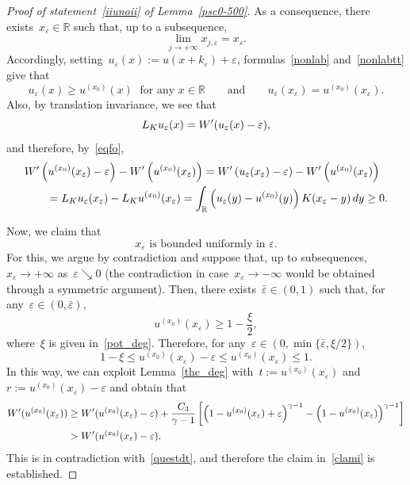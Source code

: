 \documentclass[10pt,a4paper]{amsart}
\numberwithin{equation}{section}
\newcommand{\R}{\mathbb{R}}
\renewcommand{\epsilon}{\varepsilon}
\begin{document}
\begin{proof}[Proof of statement~\eqref{iiunoii} of Lemma~\eqref{psc0-500}]
As a consequence, there exists~$x_{\epsilon} \in \R$ such that, up to a subsequence, $$\lim_{j \to +\infty} x_{j,\epsilon}=x_{\epsilon}.$$ Accordingly, setting~$u_{\epsilon}(x):= u(x+k_{\epsilon})+\epsilon$,
formulas~\eqref{nonlab} and~\eqref{nonlabtt} give that
\begin{equation}\label{eqfo}
u_{\epsilon}(x) \geq u^{(x_0)}(x) \;\mbox{ for any } x \in \R \qquad
{\mbox{and}}\qquad
u_{\epsilon}(x_{\epsilon})= u^{(x_0)}(x_{\epsilon}) .
\end{equation}
Also, by translation invariance, we see that
\begin{equation*}
{L}_K u_{\epsilon}(x) = W\rq{}(u_{\epsilon}(x)-\epsilon),
\end{equation*}
and therefore, by~\eqref{eqfo},
\begin{equation}\label{questdt}
\begin{split}&
W\rq{}\left( u^{(x_0)}(x_{\epsilon})-\epsilon \right) - W\rq{}\left( u^{(x_0)}(x_{\epsilon}) \right) = W\rq{}\left( u_{\epsilon}(x_{\epsilon})-\epsilon \right) -  W\rq{}\left( u^{(x_0)}(x_{\epsilon}) \right)\\ 
&\qquad=  {L}_K u_{\epsilon}(x_{\epsilon}) - {L}_K u^{(x_0)}(x_{\epsilon})
= \int_{\R} \left(u_{\epsilon}(y)-u^{(x_0)}(y)\right) K(x_{\epsilon}-y) \, dy \geq 0.
\end{split}
\end{equation}

Now, we claim that
\begin{equation}\label{clami}
{\mbox{$x_{\epsilon}$ is bounded uniformly in~$\epsilon$.}}
\end{equation}
For this, we argue by contradiction and suppose that, up to subsequences, $x_{\epsilon}\to +\infty$ as~$\epsilon \searrow 0$ (the contradiction in case~$x_{\epsilon}\to -\infty$ would be obtained through a symmetric argument).
Then, there exists~$\bar{\epsilon}\in(0,1)$ such that, for any~$\epsilon \in (0,\bar{\epsilon})$,
\begin{equation*}
u^{(x_0)}(x_{\epsilon}) \geq 1-\frac{\xi}{2},
\end{equation*}
where~$\xi$ is given in~\eqref{pot_deg}. Therefore, for any~$\epsilon \in (0, \min\{\bar{\epsilon}, \xi/2 \})$,
\begin{equation*}
1-\xi \leq u^{(x_0)}(x_{\epsilon})-\epsilon \leq u^{(x_0)}(x_{\epsilon}) \leq 1.
\end{equation*}
In this way, we can exploit Lemma~\ref{thc_deg} with~$t:=u^{(x_0)}(x_{\epsilon})$ and~$r:= u^{(x_0)}(x_{\epsilon})-\epsilon$ and obtain that
\begin{equation*}
\begin{split}
W\rq{}(u^{(x_0)}(x_{\epsilon})) &\geq W\rq{}(u^{(x_0)}(x_{\epsilon})-\epsilon) + \frac{C_3}{\gamma-1} \left[ \left(1-u^{(x_0)}(x_{\epsilon})+\epsilon\right)^{\gamma-1} - \left(1-u^{(x_0)}(x_{\epsilon}) \right)^{\gamma-1} \right]\\
&> W\rq{}(u^{(x_0)}(x_{\epsilon})-\epsilon).
\end{split}
\end{equation*}
This is in contradiction with~\eqref{questdt}, 
and therefore the claim in~\eqref{clami} is established. 


\end{proof}
\end{document}
